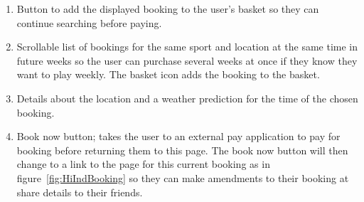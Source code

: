 \begin{enumerate}
	\item Button to add the displayed booking to the user's basket so they can
		continue searching before paying.
	\item Scrollable list of bookings for the same sport and location at the
		same time in future weeks so the user can purchase several weeks at
		once if they know they want to play weekly. The basket icon adds the
		booking to the basket.
	\item Details about the location and a weather prediction for the time of
		the chosen booking.
	\item Book now button; takes the user to an external pay application to pay
		for booking before returning them to this page. The book now button
		will then change to a link to the page for this current booking as in
		figure~\ref{fig:HiIndBooking} so they can make amendments to their
		booking at share details to their friends.
\end{enumerate}
